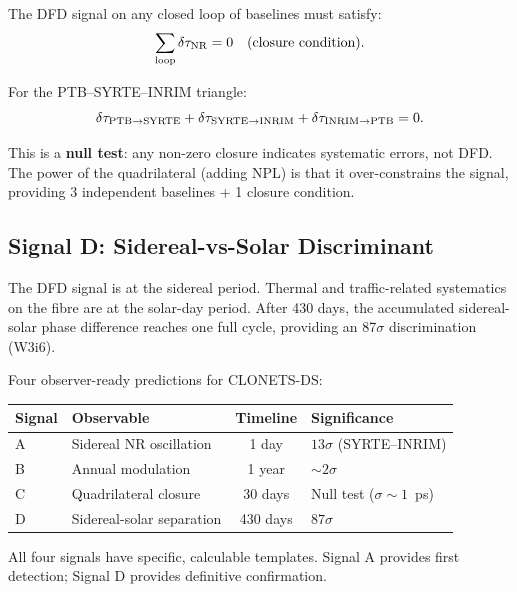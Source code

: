 \documentclass[11pt,a4paper]{article}
\newcounter{findingctr}
\newenvironment{finding}[1][]{%
  \refstepcounter{findingctr}%
  \begin{tcolorbox}[colback=blue!3!white, colframe=blue!50!black,
    title=\textbf{Finding \thefindingctr: #1}]
}{%
  \end{tcolorbox}%
}
\begin{document}
The DFD signal on any closed loop of baselines must satisfy:
\begin{equation}
\sum_{\rm loop} \delta\tau_{\rm NR} = 0
\quad\text{(closure condition)}.
\end{equation}

For the PTB--SYRTE--INRIM triangle:
\begin{equation}
\delta\tau_{\rm PTB\to SYRTE} + \delta\tau_{\rm SYRTE\to INRIM}
+ \delta\tau_{\rm INRIM\to PTB} = 0.
\end{equation}

This is a \textbf{null test}: any non-zero closure indicates
systematic errors, not DFD. The power of the quadrilateral
(adding NPL) is that it over-constrains the signal, providing
3 independent baselines + 1 closure condition.

\subsection{Signal D: Sidereal-vs-Solar Discriminant}

The DFD signal is at the sidereal period. Thermal and traffic-related
systematics on the fibre are at the solar-day period. After 430 days,
the accumulated sidereal-solar phase difference reaches one full cycle,
providing an 87$\sigma$ discrimination (W3i6).

\begin{finding}[CLONETS-DS Prediction Summary]
\label{find:CLONETS-predictions}
Four observer-ready predictions for CLONETS-DS:
\begin{center}
\begin{tabular}{llcl}
\toprule
\textbf{Signal} & \textbf{Observable} & \textbf{Timeline} & \textbf{Significance} \\
\midrule
A & Sidereal NR oscillation & 1 day & $13\sigma$ (SYRTE--INRIM) \\
B & Annual modulation & 1 year & $\sim 2\sigma$ \\
C & Quadrilateral closure & 30 days & Null test ($\sigma \sim 1$~ps) \\
D & Sidereal-solar separation & 430 days & $87\sigma$ \\
\bottomrule
\end{tabular}
\end{center}
All four signals have specific, calculable templates. Signal A
provides first detection; Signal D provides definitive confirmation.
\end{finding}


\end{document}
